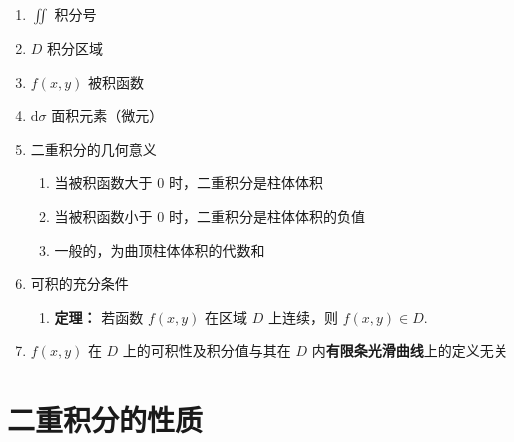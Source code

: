 \documentclass[lang = zh , final , oneside , openany , titlepage , zihao = -4 , linespread = 1.3 , baselineskip = false , cjk-font = windows , text-font = newtx , math-font = newtx , math-style = TeX]{sjtureport}
\begin{document}
\begin{enumerate}
\item
  \(\displaystyle \iint\) 积分号
\item
  \(D\) 积分区域
\item
  \(f(x,y)\) 被积函数
\item
  \(\mathrm{d}\sigma\) 面积元素（微元）
\item
  二重积分的几何意义

  \begin{enumerate}
  \item
    当被积函数大于 \(0\) 时，二重积分是柱体体积
  \item
    当被积函数小于 \(0\) 时，二重积分是柱体体积的负值
  \item
    一般的，为曲顶柱体体积的代数和
  \end{enumerate}
\item
  可积的充分条件

  \begin{enumerate}
  \item
    \textbf{定理：} 若函数 \(f(x,y)\) 在区域 \(D\) 上连续，则
    \(f(x,y)\in D\).
  \end{enumerate}
\item
  \(f(x,y)\) 在 \(D\) 上的可积性及积分值与其在 \(D\)
  内\textbf{有限条光滑曲线}上的定义无关
\end{enumerate}

\section{二重积分的性质}
\end{document}
